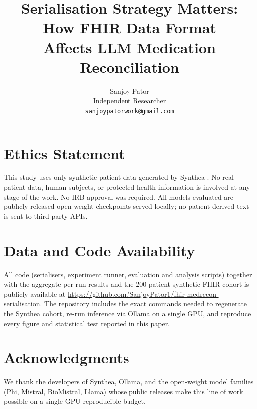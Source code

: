 \documentclass[11pt]{article}
\title{Serialisation Strategy Matters: How FHIR Data Format\\
       Affects LLM Medication Reconciliation}
\author{
  Sanjoy Pator \\
  Independent Researcher \\
  \texttt{sanjoypatorwork@gmail.com}
}
\date{}
\begin{document}
\maketitle











\section*{Ethics Statement}
This study uses only synthetic patient data generated by Synthea
\cite{walonoski2018synthea}. No real patient data, human subjects, or protected health
information is involved at any stage of the work. No IRB approval was required. All
models evaluated are publicly released open-weight checkpoints served locally; no
patient-derived text is sent to third-party APIs.

\section*{Data and Code Availability}
All code (serialisers, experiment runner, evaluation and analysis scripts) together
with the aggregate per-run results and the 200-patient synthetic FHIR cohort is
publicly available at
\url{https://github.com/SanjoyPator1/fhir-medrecon-serialisation}.
The repository includes the exact commands needed to regenerate the Synthea cohort,
re-run inference via Ollama on a single GPU, and reproduce every figure and statistical
test reported in this paper.

\section*{Acknowledgments}
We thank the developers of Synthea, Ollama, and the open-weight model families
(Phi, Mistral, BioMistral, Llama) whose public releases make this line of work possible
on a single-GPU reproducible budget.




\end{document}
